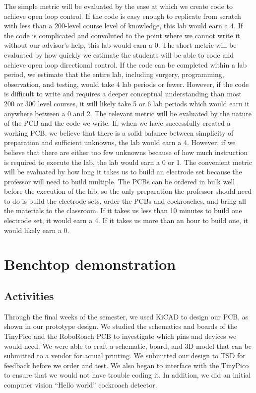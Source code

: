 \documentclass[twocolumn,10pt]{IEEEtran}
\begin{document}
The simple metric will be evaluated by the ease at which we create code to achieve open loop control. If the code is easy enough to replicate from scratch with less than a 200-level course level of knowledge, this lab would earn a 4. If the code is complicated and convoluted to the point where we cannot write it without our advisor's help, this lab would earn a 0. The short metric will be evaluated by how quickly we estimate the students will be able to code and achieve open loop directional control. If the code can be completed within a lab period, we estimate that the entire lab, including surgery, programming, observation, and testing, would take 4 lab periods or fewer. However, if the code is difficult to write and requires a deeper conceptual understanding than most 200 or 300 level courses, it will likely take 5 or 6 lab periods which would earn it anywhere between a 0 and 2. The relevant metric will be evaluated by the nature of the PCB and the code we write. If, when we have successfully created a working PCB, we believe that there is a solid balance between simplicity of preparation and sufficient unknowns, the lab would earn a 4. However, if we believe that there are either too few unknowns because of how much instruction is required to execute the lab, the lab would earn a 0 or 1. The convenient metric will be evaluated by how long it takes us to build an electrode set because the professor will need to build multiple. The PCBs can be ordered in bulk well before the execution of the lab, so the only preparation the professor should need to do is build the electrode sets, order the PCBs and cockroaches, and bring all the materials to the classroom. If it takes us less than 10 minutes to build one electrode set, it would earn a 4. If it takes us more than an hour to build one, it would likely earn a 0.

\section{Benchtop demonstration}
\subsection{Activities}
Through the final weeks of the semester, we used KiCAD to design our PCB, as shown in our prototype design. We studied the schematics and boards of the TinyPico and the RoboRoach PCB to investigate which pins and devices we would need. We were able to craft a schematic, board, and 3D model that can be submitted to a vendor for actual printing. We submitted our design to TSD for feedback before we order and test. We also began to interface with the TinyPico to ensure that we would not have trouble coding it. In addition, we did an initial computer vision ``Hello world'' cockroach detector. 
\end{document}
